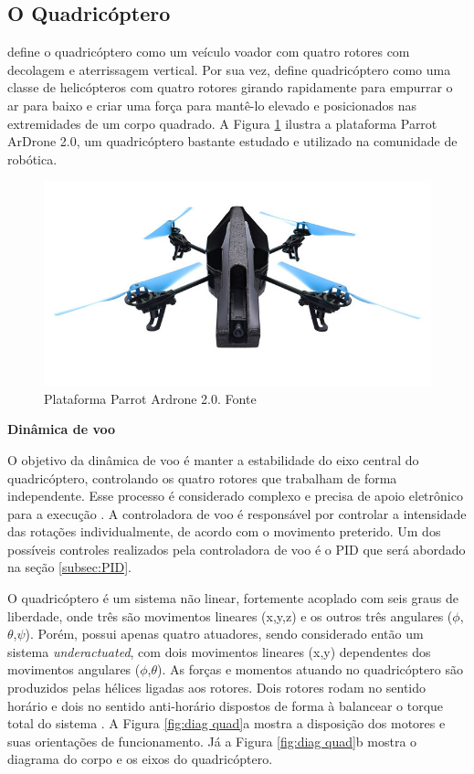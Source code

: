 \documentclass[a4paper, 12pt]{article}
\begin{document}
\subsection{O Quadricóptero}

\cite{Salih2010} define o quadricóptero como um veículo voador com quatro rotores com decolagem e aterrissagem vertical. Por sua vez, \cite{Gibiansky2010} define quadricóptero como uma classe de helicópteros com quatro rotores girando rapidamente para empurrar o ar para baixo e criar uma força para mantê-lo elevado e posicionados nas extremidades de um corpo quadrado. A Figura \ref{fig:quad} ilustra a plataforma Parrot ArDrone 2.0, um quadricóptero bastante estudado e utilizado na comunidade de robótica.

\begin{figure}[h]
	\centering
		\includegraphics[scale=0.4]{img/parrot_drone.jpg}
	\caption{Plataforma Parrot Ardrone 2.0. Fonte \cite{ardrone}}
	\label{fig:quad}
\end{figure}

\noindent\textbf{Dinâmica de voo}

O objetivo da dinâmica de voo é manter a estabilidade do eixo central do quadricóptero,  controlando os quatro rotores que trabalham de forma independente. Esse processo é considerado complexo e precisa de apoio eletrônico para a execução \cite{Gibiansky2010}. A controladora de voo é responsável por controlar a intensidade das rotações individualmente, de acordo com o movimento preterido. Um dos possíveis controles realizados pela controladora de voo é o PID que será abordado na seção \ref{subsec:PID}.

O quadricóptero é um sistema não linear, fortemente acoplado com seis graus de liberdade, onde três são movimentos lineares (x,y,z) e os outros três angulares ($\phi$,$\theta$,$\psi$). Porém, possui apenas quatro atuadores, sendo considerado então um sistema \textit{underactuated}, com dois movimentos lineares (x,y) dependentes dos movimentos angulares ($\phi$,$\theta$). As forças e momentos atuando no quadricóptero são produzidos pelas hélices ligadas aos rotores. Dois rotores rodam no sentido horário e dois no sentido anti-horário dispostos de forma à balancear o torque total do sistema \cite{Mian2008}. A Figura \ref{fig:diag quad}a mostra a disposição dos motores e suas orientações de funcionamento. Já a Figura \ref{fig:diag quad}b  mostra o diagrama do corpo e os eixos do quadricóptero.
\end{document}
